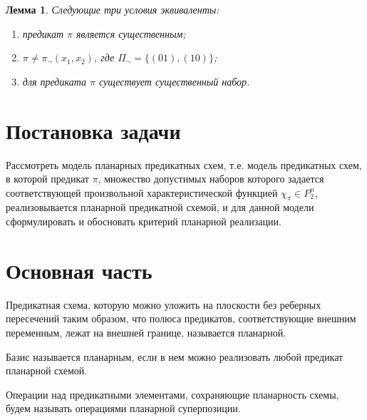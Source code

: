 \documentclass[12pt]{article}
\newtheorem{lemma}[theorem]{Лемма}
\newenvironment{definition}[1][Определение]{\begin{trivlist}
\item[\hskip \labelsep {\bfseries #1}]}{\end{trivlist}}
\begin{document}
\begin{lemma}
Следующие три условия эквиваленты: 
\begin{enumerate}
\item предикат $\pi$ является существенным;
\item $\pi \neq \pi_{\neg}(x_1, x_2)$, где $\Pi_{\neg} = \{ (01), (10) \}$;
\item для предиката $\pi$ существует существенный набор. 
\end{enumerate}\cite{Zhuk}
\end{lemma}


\clearpage

\section{Постановка задачи}
Рассмотреть модель планарных предикатных схем, т.е. модель предикатных схем, в которой предикат $\pi$, множество
допустимых наборов которого задается соответствующей произвольной характеристической функцией $\chi_{\pi} \in P_2^n$,
реализовывается планарной предикатной схемой, и для данной модели сформулировать и обосновать критерий планарной
реализации.
\clearpage

\section{Основная часть}

\begin{definition}
Предикатная схема, которую можно уложить на плоскости без реберных пересечений таким образом, что полюса предикатов, 
соответствующие внешним переменным, лежат на внешней границе, называется планарной. 
\end{definition}

\begin{definition}
Базис называется планарным, если в нем можно реализовать любой предикат планарной схемой.
\end{definition}

\begin{definition}
Операции над предикатными элементами, сохраняющие планарность схемы, будем называть операциями планарной суперпозиции.
\end{definition}
\end{document}
